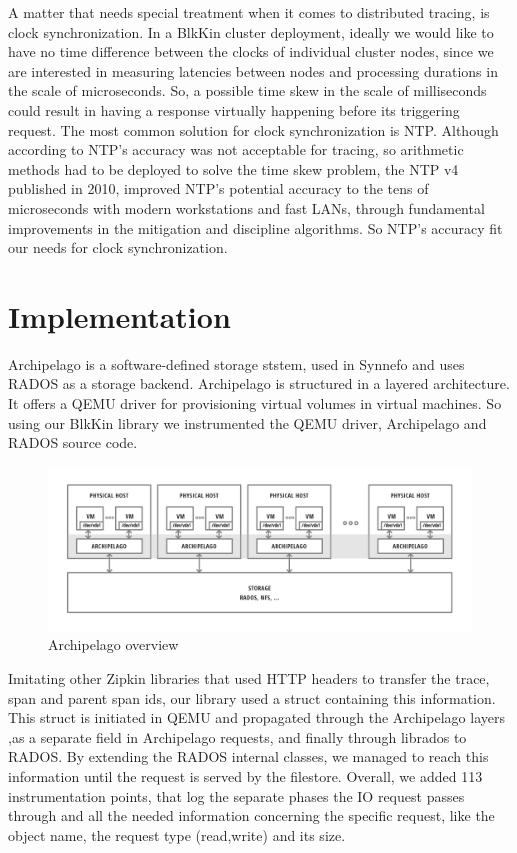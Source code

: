 \documentclass[a4paper,10pt,twocolumn]{article}
\begin{document}
A matter that needs special treatment when it comes to distributed
tracing, is clock synchronization. In a BlkKin cluster deployment, ideally we
would like to have no time difference between the clocks of individual cluster
nodes, since we are interested in measuring latencies between nodes and
processing durations in the scale of microseconds. So, a possible time skew in
the scale of milliseconds could result in having a response virtually happening
before its triggering request. The most common solution for clock
synchronization is NTP. Although according to \cite{hp} NTP's accuracy was not
acceptable for tracing, so arithmetic methods had to be deployed to solve the
time skew problem, the NTP v4 published in 2010, improved NTP's potential
accuracy to the tens of microseconds with modern workstations and fast LANs,
through fundamental improvements in the mitigation and discipline algorithms.
So NTP's accuracy fit our needs for clock synchronization.

\section{Implementation} 

Archipelago is a software-defined storage ststem, used in Synnefo\cite{synnefo}
and uses RADOS as a storage backend. Archipelago is structured in a layered
architecture. It offers a QEMU driver for provisioning virtual volumes in
virtual machines. So using our BlkKin library we instrumented the QEMU driver,
Archipelago and RADOS source code. 

\begin{figure}[h!]
  \centering
  \includegraphics[scale=0.3]{images/archipelago-overview.png}
  \caption{Archipelago overview}
  \label{fig:archipelago}
\end{figure}

Imitating other Zipkin libraries that used HTTP headers to transfer the trace,
span and parent span ids, our library used a struct containing this
information.  This struct is initiated in QEMU and propagated through the
Archipelago layers ,as a separate field in Archipelago requests, and finally
through librados to RADOS. By extending the RADOS internal classes, we managed
to reach this information until the request is served by the filestore.
Overall, we added 113 instrumentation points, that log the separate phases the
IO request passes through and all the needed information concerning the
specific request, like the object name, the request type (read,write) and its
size.
\end{document}

